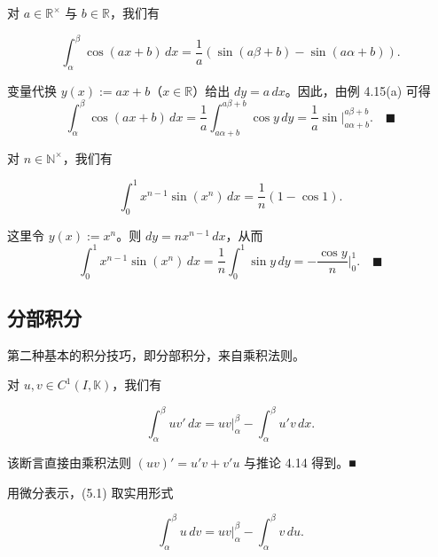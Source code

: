 \begin{example}

\begin{items}
\item

对 $ a \in \mathbb{R}^\times $ 与 $ b \in \mathbb{R} $，我们有

\[
\int_{\alpha}^{\beta} \cos(ax + b) \, dx = \frac{1}{a} ( \sin(a\beta + b) - \sin(a\alpha + b) ) .
\]

\proofhead
变量代换 $ y(x) := ax + b $（$ x \in \mathbb{R} $）给出 $ dy = a \, dx $。因此，由例 4.15(a) 可得
\[
\int_{\alpha}^{\beta} \cos(ax + b) \, dx = \frac{1}{a} \int_{a\alpha+b}^{a\beta+b} \cos y \, dy = \frac{1}{a} \sin \big|_{a\alpha+b}^{a\beta+b} .\quad\blacksquare
\]
\item

对 $ n \in \mathbb{N}^\times $，我们有

\[
\int_{0}^{1} x^{n-1} \sin(x^n) \, dx = \frac{1}{n} (1 - \cos 1) .
\]

\proofhead
这里令 $ y(x) := x^n $。则 $ dy = n x^{n-1} \, dx $，从而
\[
\int_{0}^{1} x^{n-1} \sin(x^n) \, dx = \frac{1}{n} \int_{0}^{1} \sin y \, dy = -\frac{\cos y}{n} \big|_{0}^{1} .\quad\blacksquare
\]
\end{items}

\end{example}

\subsection*{分部积分}

第二种基本的积分技巧，即分部积分，来自乘积法则。

\begin{proposition}

对 $ u, v \in C^1(I, \mathbb{K}) $，我们有

\begin{equation}
\int_{\alpha}^{\beta} u v' \, dx = u v \big|_{\alpha}^{\beta} - \int_{\alpha}^{\beta} u' v \, dx .\tag{5.1}
\end{equation}

\proofhead
该断言直接由乘积法则 $ (uv)' = u'v + v'u $ 与推论 4.14 得到。\nobreak\hspace{0.35em}■
\end{proposition}

用微分表示，(5.1) 取实用形式

\begin{equation}
\int_{\alpha}^{\beta} u \, dv = u v \big|_{\alpha}^{\beta} - \int_{\alpha}^{\beta} v \, du .\tag{5.2}
\end{equation}

